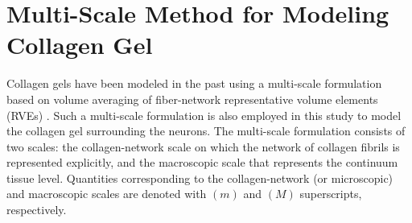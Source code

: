 \documentclass[]{interact}
\begin{document}
\section{Multi-Scale Method for Modeling Collagen Gel}
\label{sec:multi-scale_method}
Collagen gels have been modeled in the past using a multi-scale formulation based on volume averaging of fiber-network representative volume elements (RVEs) \citep{Chandran:2007hy,Stylianopoulos:2007dp,Lai:2012ji,Lake:2012jm}. Such a multi-scale formulation is also employed in this study to model the collagen gel surrounding the neurons. The multi-scale formulation consists of two scales: the collagen-network scale on which the network of collagen fibrils is represented explicitly, and the macroscopic scale that represents the continuum tissue level. Quantities corresponding to the collagen-network (or microscopic) and macroscopic scales are denoted with $(m)$ and $(M)$ superscripts, respectively. 
\end{document}
